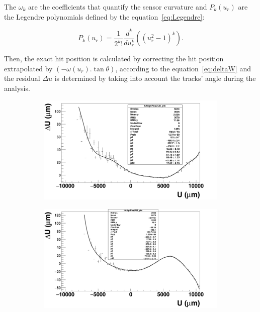       The $\omega_{k}$ are the coefficients that quantify the sensor curvature and $P_{k}(u_{r})$ are the Legendre polynomials defined by the equation~\ref{eq:Legendre}:

      \begin{equation}
        P_{k}\left(u_{r}\right) = \frac{1}{2^{k}!}\frac{d^{k}}{du_{r}^{k}} \left( (u_{r}^2 - 1)^{k}\right).
        \label{eq:Legendre}
      \end{equation}

      Then, the exact hit position is calculated by correcting the hit position extrapolated by $\left(-\omega(u_{r}).\tan{\theta}\right)$, according to the equation~\ref{eq:deltaW} and the residual $\Delta u$ is determined by taking into account the tracks' angle during the analysis.      

      \begin{figure}[h]
        \centering
        \begin{subfigure}[t]{0.45\textwidth}
          \centering
          \includegraphics[width = 1.2\textwidth]{Pictures/deformation/profileFitted_pl8.png}
          \caption{}
          \label{fig:profileFitted_front}
        \end{subfigure}
        \hfill
        \begin{subfigure}[t]{0.45\textwidth}
          \centering
          \includegraphics[width = 1.2\textwidth]{Pictures/deformation/profileFitted_pl6.png}

\end{subfigure}
\end{figure}
